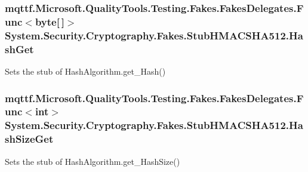 \hypertarget{class_system_1_1_security_1_1_cryptography_1_1_fakes_1_1_stub_h_m_a_c_s_h_a512_a69df109f3d4db66afa3e645ca5a0171b}{
\subsubsection[{Hash\-Get}]{\setlength{\rightskip}{0pt plus 5cm}mqttf.\-Microsoft.\-Quality\-Tools.\-Testing.\-Fakes.\-Fakes\-Delegates.\-Func$<$byte\mbox{[}$\,$\mbox{]}$>$ System.\-Security.\-Cryptography.\-Fakes.\-Stub\-H\-M\-A\-C\-S\-H\-A512.\-Hash\-Get}}\label{class_system_1_1_security_1_1_cryptography_1_1_fakes_1_1_stub_h_m_a_c_s_h_a512_a69df109f3d4db66afa3e645ca5a0171b}


Sets the stub of Hash\-Algorithm.\-get\-\_\-\-Hash()

\hypertarget{class_system_1_1_security_1_1_cryptography_1_1_fakes_1_1_stub_h_m_a_c_s_h_a512_a0a34df7ad4155bc06166f3b3840bc0ea}{
\subsubsection[{Hash\-Size\-Get}]{\setlength{\rightskip}{0pt plus 5cm}mqttf.\-Microsoft.\-Quality\-Tools.\-Testing.\-Fakes.\-Fakes\-Delegates.\-Func$<$int$>$ System.\-Security.\-Cryptography.\-Fakes.\-Stub\-H\-M\-A\-C\-S\-H\-A512.\-Hash\-Size\-Get}}\label{class_system_1_1_security_1_1_cryptography_1_1_fakes_1_1_stub_h_m_a_c_s_h_a512_a0a34df7ad4155bc06166f3b3840bc0ea}


Sets the stub of Hash\-Algorithm.\-get\-\_\-\-Hash\-Size()

